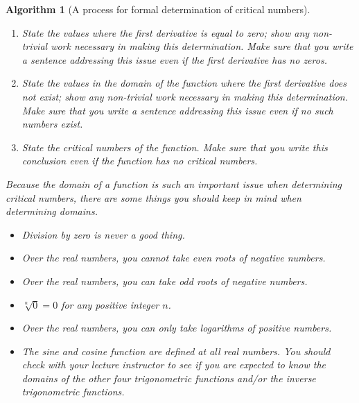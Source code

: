 \documentclass[12pt,]{book}
\theoremstyle{plain}
\newtheorem{algorithm}[theorem]{Algorithm}
\theoremstyle{definition}
\numberwithin{equation}{section}
\begin{document}
\begin{algorithm}[A process for formal determination of critical numbers]
\begin{enumerate}
                \item{}State the values where the first derivative is equal to zero; show any non-trivial work necessary in making this determination.  Make sure that you write a sentence addressing this issue even if the first derivative has no zeros.\item{}State the values \emph{in the domain of the function} where the first derivative does not exist; show any non-trivial work necessary in making this determination.    Make sure that you write a sentence addressing this issue even if no such numbers exist.\item{}State the critical numbers of the function.  Make sure that you write this conclusion even if the function has no critical numbers.\end{enumerate}
\par
Because the domain of a function is such an important issue when determining critical numbers, there are some things you should keep in mind when determining domains.%
\begin{multicols}{2}
\begin{itemize}[label=\textbullet]
\item{}Division by zero is never a good thing.\item{}Over the real numbers, you \emph{cannot} take \emph{even} roots of negative numbers.\item{}Over the real numbers, you \emph{can} take \emph{odd} roots of negative numbers.\item{}\(\sqrt[n]{0}=0\) for any positive integer \(n\).\item{}Over the real numbers, you can only take logarithms of positive numbers.\item{}The sine and cosine function are defined at all real numbers.  You should check with your lecture instructor to see if you are expected to know the domains of the other four trigonometric functions and/or the inverse trigonometric functions.\end{itemize}
\end{multicols}
\end{algorithm}
\typeout{************************************************}
\typeout{************************************************}
\end{document}
